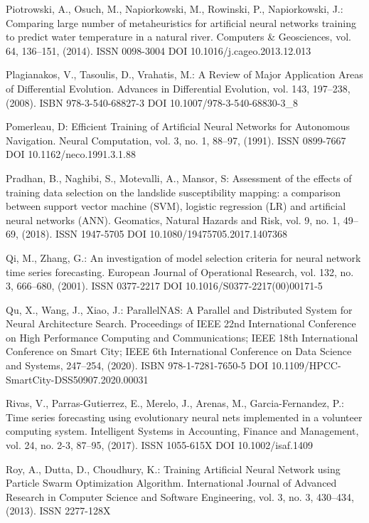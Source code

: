 \begin{thebibliography}{99.}
 Piotrowski, A., Osuch, M., Napiorkowski, M., Rowinski, P., Napiorkowski, J.: Comparing large number of metaheuristics for artificial neural networks training to predict water temperature in a natural river. Computers \& Geosciences, vol. 64, 136--151, (2014). ISSN 0098-3004 DOI 10.1016/j.cageo.2013.12.013

 Plagianakos, V., Tasoulis, D., Vrahatis, M.: A Review of Major Application Areas of Differential Evolution. Advances in Differential Evolution, vol. 143, 197--238, (2008). ISBN 978-3-540-68827-3 DOI 10.1007/978-3-540-68830-3\_8

 Pomerleau, D: Efficient Training of Artificial Neural Networks for Autonomous Navigation. Neural Computation, vol. 3, no. 1, 88--97, (1991). ISSN 0899-7667 DOI 10.1162/neco.1991.3.1.88

 Pradhan, B., Naghibi, S., Motevalli, A., Mansor, S: Assessment of the effects of training data selection on the landslide susceptibility mapping: a comparison between support vector machine (SVM), logistic regression (LR) and artificial neural networks (ANN). Geomatics, Natural Hazards and Risk, vol. 9, no. 1, 49--69, (2018). ISSN 1947-5705 DOI 10.1080/19475705.2017.1407368

 Qi, M., Zhang, G.: An investigation of model selection criteria for neural network time series forecasting. European Journal of Operational Research, vol. 132, no. 3, 666--680, (2001). ISSN 0377-2217 DOI 10.1016/S0377-2217(00)00171-5

 Qu, X., Wang, J., Xiao, J.: ParallelNAS: A Parallel and Distributed System for Neural Architecture Search. Proceedings of IEEE 22nd International Conference on High Performance Computing and Communications; IEEE 18th International Conference on Smart City; IEEE 6th International Conference on Data Science and Systems, 247--254, (2020). ISBN 978-1-7281-7650-5 DOI 10.1109/HPCC-SmartCity-DSS50907.2020.00031

 Rivas, V., Parras-Gutierrez, E., Merelo, J., Arenas, M., Garcia-Fernandez, P.: Time series forecasting using evolutionary neural nets implemented in a volunteer computing system. Intelligent Systems in Accounting, Finance and Management, vol. 24, no. 2-3, 87--95, (2017). ISSN 1055-615X DOI 10.1002/isaf.1409

 Roy, A., Dutta, D., Choudhury, K.: Training Artificial Neural Network using Particle Swarm Optimization Algorithm. International Journal of Advanced Research in Computer Science and Software Engineering, vol. 3, no. 3, 430--434, (2013). ISSN 2277-128X


\end{thebibliography}
